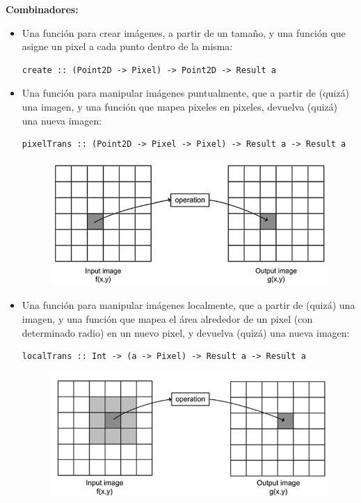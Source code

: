\documentclass[a4paper, 11pt]{article} %
\begin{document}
	\textbf{Combinadores:}
	\begin{itemize}
		\item Una función para crear imágenes, a partir de un tamaño, y una función que asigne un pixel a cada punto dentro de la misma: 
		\begin{lstlisting}
create :: (Point2D -> Pixel) -> Point2D -> Result a
		\end{lstlisting}

		\item Una función para manipular imágenes puntualmente, que a partir de (quizá) una imagen, y una función que mapea pixeles en pixeles, devuelva (quizá) una nueva imagen:
		\begin{lstlisting}
pixelTrans :: (Point2D -> Pixel -> Pixel) -> Result a -> Result a
		\end{lstlisting}
		\begin{figure}[!h]
			\begin{center}
				\includegraphics[scale=0.4]{pixeltrans.png}
			\end{center}
		\end{figure}
			  
		\item Una función para manipular imágenes localmente, que a partir de (quizá) una imagen, y una función que mapea el área alrededor de un pixel (con determinado radio) en un nuevo pixel, y devuelva (quizá) una nueva imagen:
		\begin{lstlisting}
localTrans :: Int -> (a -> Pixel) -> Result a -> Result a
		\end{lstlisting}
		\begin{figure}[!h]
			\begin{center}
				\includegraphics[scale=0.4]{localtrans.png}
			\end{center}
		\end{figure}
	\end{itemize}
	
\end{document}

